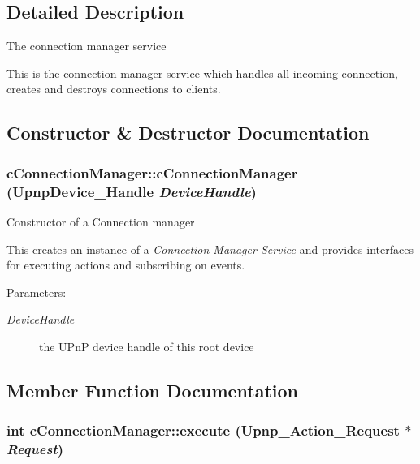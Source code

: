 \subsection{Detailed Description}
The connection manager service

This is the connection manager service which handles all incoming connection, creates and destroys connections to clients. 

\subsection{Constructor \& Destructor Documentation}
\hypertarget{classcConnectionManager_2d6d4af3110c40c399a3e4e203283ff1}{
\subsubsection[{cConnectionManager}]{\setlength{\rightskip}{0pt plus 5cm}cConnectionManager::cConnectionManager (UpnpDevice\_\-Handle {\em DeviceHandle})}}
\label{classcConnectionManager_2d6d4af3110c40c399a3e4e203283ff1}


Constructor of a Connection manager

This creates an instance of a {\em Connection Manager Service\/} and provides interfaces for executing actions and subscribing on events. \begin{Desc}
\item[Parameters:]
\begin{description}
\item[{\em DeviceHandle}]the UPnP device handle of this root device \end{description}
\end{Desc}


\subsection{Member Function Documentation}
\hypertarget{classcConnectionManager_12fa6b0a9e20c3af663e3ca2b3c97dfb}{
\subsubsection[{execute}]{\setlength{\rightskip}{0pt plus 5cm}int cConnectionManager::execute (Upnp\_\-Action\_\-Request $\ast$ {\em Request})}}
\label{classcConnectionManager_12fa6b0a9e20c3af663e3ca2b3c97dfb}


